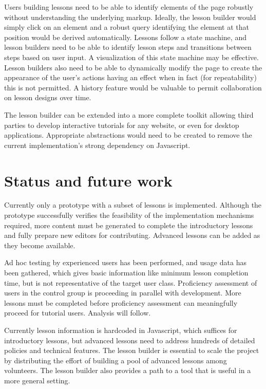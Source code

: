 \documentclass{acm_proc_article-sp}
\begin{document}
Users building lessons need to be able to identify elements of the page robustly without understanding the underlying markup. Ideally, the lesson builder would simply click on an element and a robust query identifying the element at that position would be derived automatically. Lessons follow a state machine, and lesson builders need to be able to identify lesson steps and transitions between steps based on user input. A visualization of this state machine may be effective. Lesson builders also need to be able to dynamically modify the page to create the appearance of the user's actions having an effect when in fact (for repeatability) this is not permitted. A history feature would be valuable to permit collaboration on lesson designs over time.

The lesson builder can be extended into a more complete toolkit allowing third parties to develop interactive tutorials for any website, or even for desktop applications. Appropriate abstractions would need to be created to remove the current implementation's strong dependency on Javascript.

\section{Status and future work}

Currently only a prototype with a subset of lessons is implemented. Although the prototype successfully
verifies the feasibility of the implementation mechanisms required, more content
must be generated to complete the introductory lessons and fully prepare new
editors for contributing. Advanced lessons can be added as they become available.

Ad hoc testing by experienced users has been performed, and usage data has been
gathered, which gives basic information like minimum lesson completion time,
but is not representative of the target user class. Proficiency assessment of
users in the control group is proceeding in parallel with development. More lessons must
be completed before proficiency assessment can meaningfully proceed for tutorial users.
Analysis will follow.

Currently lesson information is hardcoded in Javascript, which suffices for introductory
lessons, but advanced lessons need to address hundreds of detailed policies and
technical features. The lesson builder is essential to scale the project by distributing
the effort of building  a pool of advanced lessons among volunteers. The lesson
builder also provides a path to a tool that is useful in a more general setting.
\end{document}
